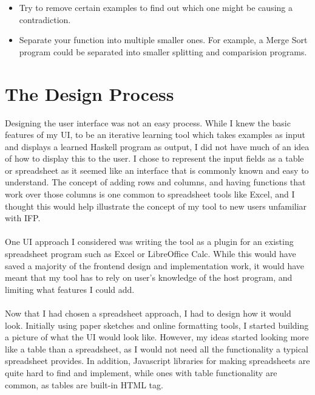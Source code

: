 \begin{itemize}
\item Try to remove certain examples to find out which one might be causing a contradiction.
\item Separate your function into multiple smaller ones. For example, a Merge Sort program could be separated into smaller splitting and comparision programs.
\end{itemize}

\pagebreak

\section{The Design Process}
Designing the user interface was not an easy process. While I knew the basic features of my UI, to be an iterative learning tool which takes examples as input and displays a learned Haskell program as output, I did not have much of an idea of how to display this to the user. I chose to represent the input fields as a table or spreadsheet as it seemed like an interface that is commonly known and easy to understand. The concept of adding rows and columns, and having functions that work over those columns is one common to spreadsheet tools like Excel, and I thought this would help illustrate the concept of my tool to new users unfamiliar with IFP. \\ \\
One UI approach I considered was writing the tool as a plugin for an existing spreadsheet program such as Excel or LibreOffice Calc. While this would have saved a majority of the frontend design and implementation work, it would have meant that my tool has to rely on user's knowledge of the host program, and limiting what features I could add. \\ \\
Now that I had chosen a spreadsheet approach, I had to design how it would look. Initially using paper sketches and online formatting tools, I started building a picture of what the UI would look like. However, my ideas started looking more like a table than a spreadsheet, as I would not need all the functionality a typical spreadsheet provides. In addition, Javascript libraries for making spreadsheets are quite hard to find and implement, while ones with table functionality are common, as tables are built-in HTML tag.

